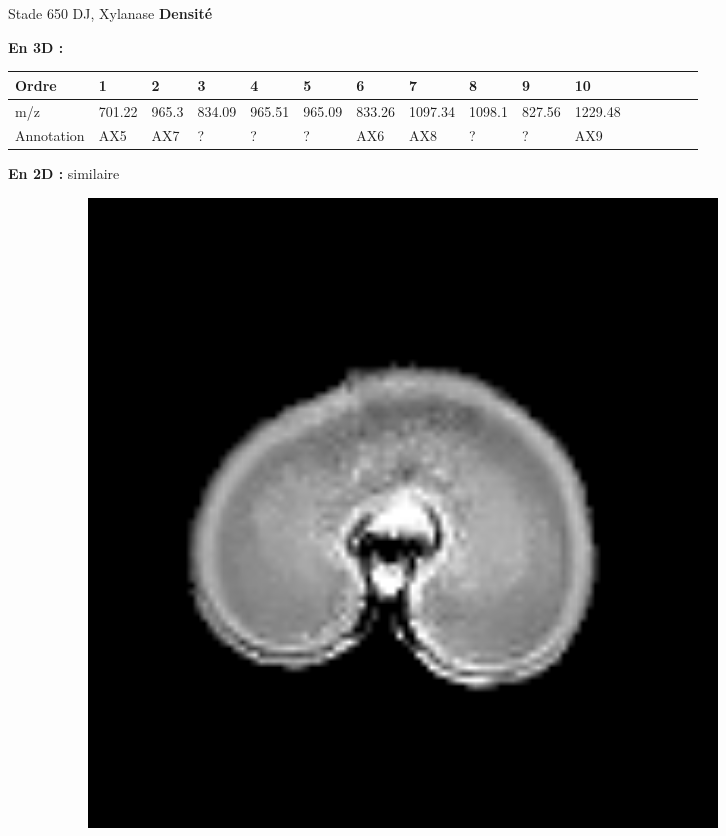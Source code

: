 \documentclass[10pt]{beamer}
\begin{document}
\begin{frame}{Stade 650 DJ, Xylanase}
  \textbf{Densité}
  
  \textbf{En 3D :}
  \vspace{-0.4cm}
    \begin{table}[]
    \centering
    \begin{adjustbox}{max width=1\textwidth}
      \begin{tabular}{llllllllllllllll}
        \toprule
        Ordre & 1       & 2       & 3       & 4       & 5       & 6       & 7       & 8       & 9       & 10       \\
        \midrule
        m/z &     701.22 & 965.3 & 834.09 & 965.51 & 965.09 & 833.26 & 1097.34 & 1098.1 & 827.56 & 1229.48 \\
        Annotation &  AX5 & AX7 & ? & ? & ? & AX6 & AX8 & ?  & ? & AX9\\
        \bottomrule
      \end{tabular}
    \end{adjustbox}
  \end{table}


  \textbf{En 2D :} similaire

  \begin{figure}[ht]
    \centering
    \begin{subfigure}[t]{0.33\textwidth}
      \centering
      \includegraphics[width=0.9\textwidth]{fig/stats_500Lich_density_irm}


\end{subfigure}
\end{figure}
\end{frame}
\end{document}
